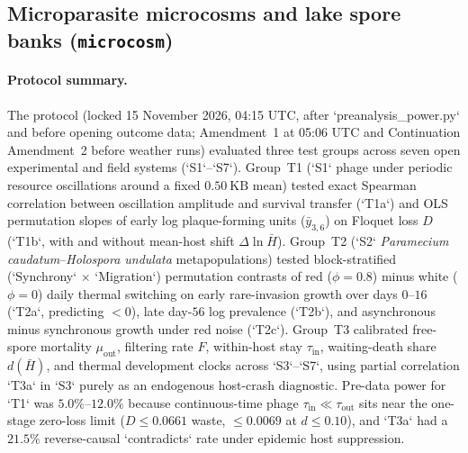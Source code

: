 \subsection{Microparasite microcosms and lake spore banks (\texttt{microcosm})}\label{num-esm-microcosm}

\paragraph{Protocol summary.}
The protocol (locked 15 November 2026, 04:15 UTC, after `preanalysis\_power.py` and before opening outcome data; Amendment~1 at 05:06 UTC and Continuation Amendment~2 before weather runs) evaluated three test groups across seven open experimental and field systems (`S1`--`S7`). Group~T1 (`S1` phage under periodic resource oscillations around a fixed $0.50\ \mathrm{KB}$ mean) tested exact Spearman correlation between oscillation amplitude and survival transfer (`T1a`) and OLS permutation slopes of early log plaque-forming units ($\bar{y}_{3,6}$) on Floquet loss $D$ (`T1b`, with and without mean-host shift $\Delta\ln\bar{H}$). Group~T2 (`S2` \textit{Paramecium caudatum}--\textit{Holospora undulata} metapopulations) tested block-stratified (`Synchrony` $\times$ `Migration`) permutation contrasts of red ($\phi = 0.8$) minus white ($\phi = 0$) daily thermal switching on early rare-invasion growth over days $0$--$16$ (`T2a`, predicting $< 0$), late day-$56$ log prevalence (`T2b`), and asynchronous minus synchronous growth under red noise (`T2c`). Group~T3 calibrated free-spore mortality $\mu_{\mathrm{out}}$, filtering rate $F$, within-host stay $\tau_{\mathrm{in}}$, waiting-death share $d(\bar{H})$, and thermal development clocks across `S3`--`S7`, using partial correlation `T3a` in `S3` purely as an endogenous host-crash diagnostic. Pre-data power for `T1` was $5.0\%$--$12.0\%$ because continuous-time phage $\tau_{\mathrm{in}} \ll \tau_{\mathrm{out}}$ sits near the one-stage zero-loss limit ($D \le 0.0661$ waste, $\le 0.0069$ at $d \le 0.10$), and `T3a` had a $21.5\%$ reverse-causal `contradicts` rate under epidemic host suppression.

